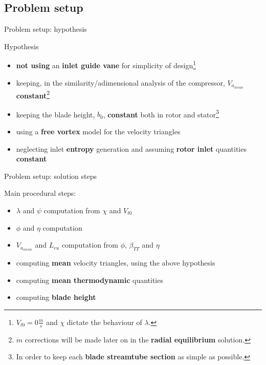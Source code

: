 \subsection{Problem setup}
	{\nologo
	\begin{frame}{Problem setup: hypothesis}
	\begin{alertblock}{Hypothesis}
		\begin{itemize}
			\item \textbf{not using} an \textbf{inlet guide vane} for simplicity of design\footnote{$V_{t0} = 0 \frac{m}{s}$ and $\chi$ dictate the behaviour of $\lambda$.}
			\item keeping, in the similarity/adimensional analysis of the compressor, $V_{a_{mean}}$ \textbf{constant}\footnote{$\dot{m}$ corrections will be made later on in the \textbf{radial equilibrium} solution.}  
			\item keeping the blade height, $b_0$, \textbf{constant} both in rotor and stator\footnote{In order to keep each \textbf{blade streamtube section} as simple as possible.}
			\item using a \textbf{free vortex} model for the velocity triangles
			\item neglecting inlet \textbf{entropy} generation and assuming \textbf{rotor inlet} quantities \textbf{constant}
		\end{itemize}
	\end{alertblock}
	\end{frame}
	}
		\begin{frame}{Problem setup: solution steps}
		\begin{block}{Main procedural steps:}
			\begin{itemize}
				\item $\lambda$ and $\psi$ computation from $\chi$ and $V_{t0}$
				\item $\phi$ and $\eta$ computation 
				\item $V_{a_{mean}}$ and $L_{eu}$ computation from $\phi$, $\beta_{TT}$ and $\eta$
				\item computing \textbf{mean} velocity triangles, using the above hypothesis
				\item computing \textbf{mean thermodynamic} quantities 
				\item computing \textbf{blade height}
			\end{itemize}
		\end{block}
	\end{frame}
